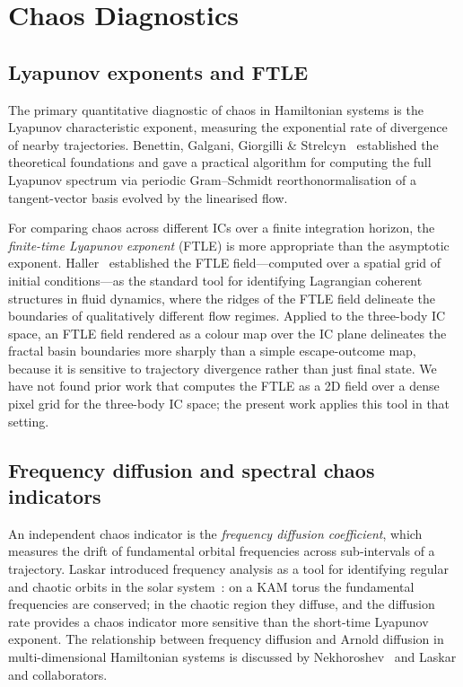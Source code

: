 \documentclass[11pt,a4paper]{article}
\begin{document}
\section{Chaos Diagnostics}
\label{sec:chaos}

\subsection{Lyapunov exponents and FTLE}

The primary quantitative diagnostic of chaos in Hamiltonian systems is the Lyapunov
characteristic exponent, measuring the exponential rate of divergence of nearby trajectories.
Benettin, Galgani, Giorgilli \& Strelcyn~\cite{benettin1980} established the theoretical
foundations and gave a practical algorithm for computing the full Lyapunov spectrum via periodic
Gram--Schmidt reorthonormalisation of a tangent-vector basis evolved by the linearised flow.

For comparing chaos across different ICs over a finite integration horizon, the
\emph{finite-time Lyapunov exponent} (FTLE) is more appropriate than the asymptotic exponent.
Haller~\cite{haller2001} established the FTLE field---computed over a spatial grid of initial
conditions---as the standard tool for identifying Lagrangian coherent structures in fluid
dynamics, where the ridges of the FTLE field delineate the boundaries of qualitatively different
flow regimes.  Applied to the three-body IC space, an FTLE field rendered as a colour map over
the IC plane delineates the fractal basin boundaries more sharply than a simple escape-outcome
map, because it is sensitive to trajectory divergence rather than just final state.  We have not
found prior work that computes the FTLE as a 2D field over a dense pixel grid for the three-body
IC space; the present work applies this tool in that setting.

\subsection{Frequency diffusion and spectral chaos indicators}
\label{sec:freqdiff}

An independent chaos indicator is the \emph{frequency diffusion coefficient}, which measures
the drift of fundamental orbital frequencies across sub-intervals of a trajectory.  Laskar
introduced frequency analysis as a tool for identifying regular and chaotic orbits in the solar
system~\cite{laskar1990,laskar1993}: on a KAM torus the fundamental frequencies are conserved;
in the chaotic region they diffuse, and the diffusion rate provides a chaos indicator more
sensitive than the short-time Lyapunov exponent.  The relationship between frequency diffusion
and Arnold diffusion in multi-dimensional Hamiltonian systems is discussed by
Nekhoroshev~\cite{nekhoroshev1977} and Laskar and collaborators.
\end{document}
